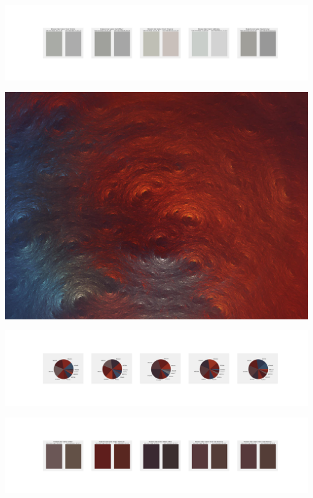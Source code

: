 \documentclass[11pt]{article}
\begin{document}
\begin{landscape}
    \begin{center}
    \includegraphics[width=250mm]{./nbimg/peak-61.jpg}
    \end{center}
    

    \begin{center}
    \includegraphics[width=\textwidth]{./nbimg/file (155).jpg}
    \end{center}

    \begin{center}
    \includegraphics[width=250mm]{./nbimg/pie-62.jpg}
    \end{center}

    \begin{center}
    \includegraphics[width=250mm]{./nbimg/peak-62.jpg}
    \end{center}
    


\end{landscape}
\end{document}

